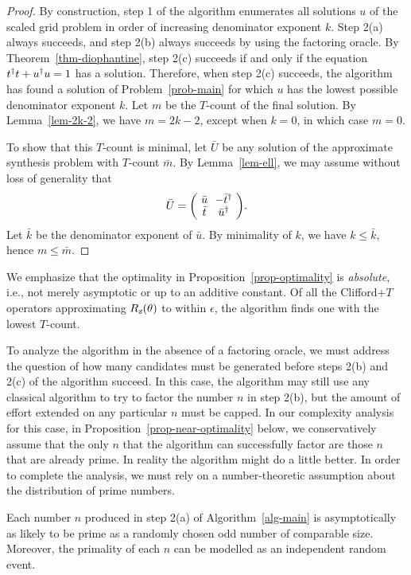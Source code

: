 \documentclass{article}
\begin{document}
\begin{proof}
  By construction, step 1 of the algorithm enumerates all solutions
  $u$ of the scaled grid problem in order of increasing denominator
  exponent $k$. Step 2(a) always succeeds, and step 2(b) always
  succeeds by using the factoring oracle. By
  Theorem~\ref{thm-diophantine}, step 2(c) succeeds if and only if the
  equation $t^{\dagger} t+u^{\dagger} u=1$ has a solution. Therefore, when step 2(c)
  succeeds, the algorithm has found a solution of
  Problem~\ref{prob-main} for which $u$ has the lowest possible
  denominator exponent $k$.  Let $m$ be the $T$-count of the final
  solution. By Lemma~\ref{lem-2k-2}, we have $m=2k-2$, except when
  $k=0$, in which case $m=0$.
  
  To show that this $T$-count is minimal, let $\bar U$ be any solution
  of the approximate synthesis problem with $T$-count $\bar m$. By
  Lemma~\ref{lem-ell}, we may assume without loss of generality that
  \[ \bar U = \zmatrix{cc}{\bar u & -\bar t\da \\ \bar t & \bar u\da}.
  \]
  Let $\bar k$ be the denominator exponent of $\bar u$. By minimality
  of $k$, we have $k\leq \bar k$, hence $m\leq \bar m$. 
\end{proof}

We emphasize that the optimality in Proposition~\ref{prop-optimality}
is {\em absolute}, i.e., not merely asymptotic or up to an additive
constant.  Of all the Clifford+$T$ operators approximating
$R_{\textsl{z}}(\theta)$ to within $\epsilon$, the algorithm finds one with the
lowest $T$-count.

To analyze the algorithm in the absence of a factoring oracle, we must
address the question of how many candidates must be generated before
steps 2(b) and 2(c) of the algorithm succeed. In this case, the
algorithm may still use any classical algorithm to try to factor the
number $n$ in step 2(b), but the amount of effort extended on any
particular $n$ must be capped. In our complexity analysis for this
case, in Proposition~\ref{prop-near-optimality} below, we
conservatively assume that the only $n$ that the algorithm can
successfully factor are those $n$ that are already prime. In reality
the algorithm might do a little better. In order to complete the
analysis, we must rely on a number-theoretic assumption about the
distribution of prime numbers.

\begin{hypothesis}\label{hyp-numbers}
  Each number $n$ produced in step 2(a) of Algorithm~\ref{alg-main} is
  asymptotically as likely to be prime as a randomly chosen odd number
  of comparable size. Moreover, the primality of each $n$ can be
  modelled as an independent random event.
\end{hypothesis}
\end{document}
